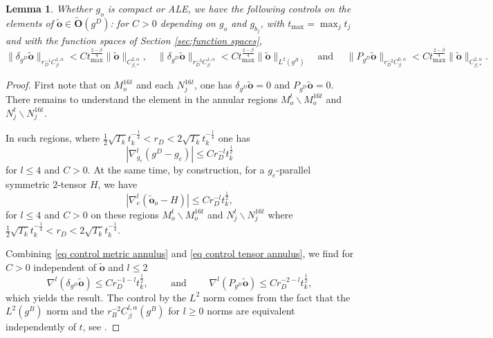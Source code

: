 \documentclass[11pt,reqno]{amsart}
\numberwithin{equation}{section}
\newtheorem{lemma}[thm]{Lemma}
\theoremstyle{definition}
\theoremstyle{remark}
\begin{document}
\begin{lemma}\label{lem: div P obst}
    Whether $g_o$ is compact or ALE, we have the following controls on the elements of $\tilde{\mathbf{o}}\in\tilde{\mathbf{O}}(g^D)$: for $C>0$ depending on $g_o$ and $g_{b_j}$, with $t_{\max} = \max_jt_j$ and with the function spaces of Section \ref{sec:function spaces},
\begin{equation}\label{eq:control operators on tilde o}
\| \delta_{g^D} \tilde{\mathbf{o}} \|_{r_D^{-1}C^{1,\alpha}_\beta}< C t_{\max}^{\frac{2-\beta}4} \| \tilde{\mathbf{o}} \|_{C^{2,\alpha}_{\beta,*}},\quad \| \delta_{g^D} \tilde{\mathbf{o}} \|_{r_D^{-3}C^{1,\alpha}_\beta}< C t_{\max}^{\frac{2-\beta}4} \|\tilde{\mathbf{o}} \|_{L^2(g^B)}\quad\text{and }\quad
\| P_{g^D} \tilde{\mathbf{o}} \|_{r_D^{-2}C^{0,\alpha}_\beta}< C t_{\max}^{\frac{2-\beta}4} \| \tilde{\mathbf{o}} \|_{C^{2,\alpha}_{\beta,*}}.
\end{equation}
\end{lemma}
\begin{proof}
    First note that on $M^{16t}_o$ and each $N_j^{16t}$, one has $ \delta_{g^D} \tilde{\mathbf{o}} = 0 $ and $ P_{g^D} \tilde{\mathbf{o}} = 0 $. There remains to understand the element in the annular regions $M^t_o\backslash M^{16t}_o$ and $N^t_j\backslash N^{16t}_j$.

    In such regions, where $\frac1{2}\sqrt{T_k}t_k^{-\frac1{4}}<r_D<2\sqrt{T_k}t_k^{-\frac1{4}}$ one has 
    \begin{equation}\label{eq control metric annulus}
        |\nabla^l_{g_{e}}(g^D - g_{e})| \leqslant C r_D^{-l}t_k^{\frac1{2}}
    \end{equation}
 for $l\leqslant 4$ and $C>0$. At the same time, by construction, for a $g_{e}$-parallel symmetric $2$-tensor $H$, we have 
 \begin{equation}\label{eq control tensor annulus}
     |\nabla_{e}^l(\tilde{\mathbf{o}}_{o} - H)| \leqslant C r_D^{-l} t_k^{\frac1{2}},
 \end{equation}
for $l\leqslant 4$ and $C>0$ on these regions $M^t_o\backslash M^{16t}_o$ and $N^t_j\backslash N^{16t}_j$ where 
 $\frac1{2}\sqrt{T_k}t_k^{-\frac1{4}}<r_D<2\sqrt{T_k}t_k^{-\frac1{4}}$.

Combining \eqref{eq control metric annulus} and \eqref{eq control tensor annulus}, we find for $C>0$ independent of $\tilde{\mathbf{o}}$ and $l\leqslant 2$
$$ \nabla^l(\delta_{g^D} \tilde{\mathbf{o}}) \leqslant C r_D^{-1-l} t_k^{\frac1{2}}, \qquad \text{ and } \qquad \nabla^l(P_{g^D} \tilde{\mathbf{o}}) \leqslant C r_D^{-2-l} t_k^{\frac1{2}},$$
which yields the result. The control by the $L^2$ norm comes from the fact that the $L^2(g^B)$ norm and the $r_B^{-2}C^{l,\alpha}_{\beta}(g^B)$ for $l\geqslant 0$ norms are equivalent independently of $t$, see \cite[Remark 4.45]{ozu2}.
\end{proof}
\end{document}

